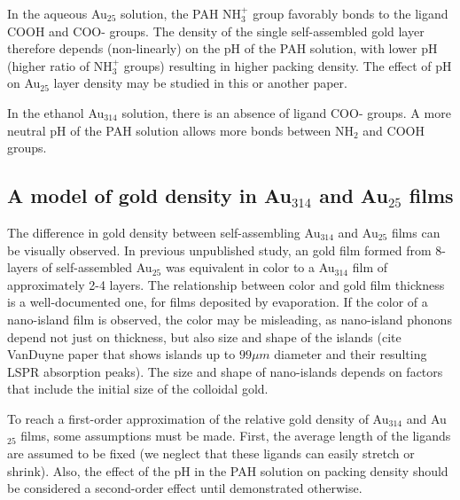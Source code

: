 \documentclass[12pt,oneside,english]{article}
\begin{document}
	In the aqueous Au$_{25}$ solution, the PAH NH$_3^+$ group favorably bonds to the ligand COOH and COO- groups.
	The density of the single self-assembled gold layer therefore depends (non-linearly) on the pH of the PAH solution, with lower pH (higher ratio of NH$_3^+$ groups) resulting in higher packing density.
	The effect of pH on Au$_{25}$ layer density may be studied in this or another paper.
	
	In the ethanol Au$_{314}$ solution, there is an absence of ligand COO- groups.
	A more neutral pH of the PAH solution allows more bonds between NH$_2$ and COOH groups.
	
	\subsection{A model of gold density in Au$_{314}$ and Au$_{25}$ films}
	The difference in gold density between self-assembling Au$_{314}$ and Au$_{25}$ films can be visually observed.
	In previous unpublished study, an gold film formed from 8-layers of self-assembled Au$_{25}$ was equivalent in color to a Au$_{314}$ film of approximately 2-4 layers.
	The relationship between color and gold film thickness is a well-documented one, for films deposited by evaporation.
	If the color of a nano-island film is observed, the color may be misleading, as nano-island phonons depend not just on thickness, but also size and shape of the islands \cite{link99} (cite VanDuyne paper that shows islands up to $99{\mu}m$ diameter and their resulting LSPR absorption peaks).
	The size and shape of nano-islands depends on factors that include the initial size of the colloidal gold.
	
	To reach a first-order approximation of the relative gold density of Au$_{314}$ and Au$_{25}$ films, some assumptions must be made.
	First, the average length of the ligands are assumed to be fixed (we neglect that these ligands can easily stretch or shrink).
	Also, the effect of the pH in the PAH solution on packing density should be considered a second-order effect until demonstrated otherwise.	
	
\end{document}
